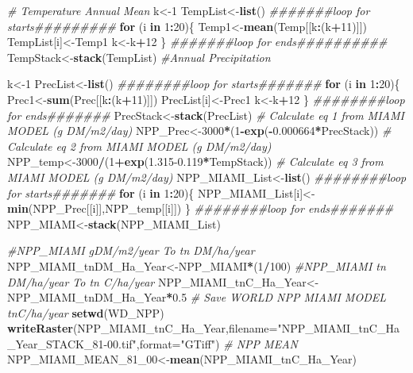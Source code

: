 \documentclass[
  10pt,
  b5paper,
]{book}
\newenvironment{Shaded}{\begin{snugshade}}{\end{snugshade}}
\newcommand{\CommentTok}[1]{\textcolor[rgb]{0.56,0.35,0.01}{\textit{#1}}}
\newcommand{\ControlFlowTok}[1]{\textcolor[rgb]{0.13,0.29,0.53}{\textbf{#1}}}
\newcommand{\DataTypeTok}[1]{\textcolor[rgb]{0.13,0.29,0.53}{#1}}
\newcommand{\DecValTok}[1]{\textcolor[rgb]{0.00,0.00,0.81}{#1}}
\newcommand{\FloatTok}[1]{\textcolor[rgb]{0.00,0.00,0.81}{#1}}
\newcommand{\KeywordTok}[1]{\textcolor[rgb]{0.13,0.29,0.53}{\textbf{#1}}}
\newcommand{\NormalTok}[1]{#1}
\newcommand{\OperatorTok}[1]{\textcolor[rgb]{0.81,0.36,0.00}{\textbf{#1}}}
\newcommand{\StringTok}[1]{\textcolor[rgb]{0.31,0.60,0.02}{#1}}
\begin{document}
\begin{Shaded}
\begin{Highlighting}[]
\CommentTok{# Temperature Annual Mean }
\NormalTok{k<-}\DecValTok{1}
\NormalTok{TempList<-}\KeywordTok{list}\NormalTok{()}
\CommentTok{#######loop for starts#########}
\ControlFlowTok{for}\NormalTok{ (i }\ControlFlowTok{in} \DecValTok{1}\OperatorTok{:}\DecValTok{20}\NormalTok{)\{}
\NormalTok{Temp1<-}\KeywordTok{mean}\NormalTok{(Temp[[k}\OperatorTok{:}\NormalTok{(k}\OperatorTok{+}\DecValTok{11}\NormalTok{)]])}
\NormalTok{TempList[i]<-Temp1}
\NormalTok{k<-k}\OperatorTok{+}\DecValTok{12}
\NormalTok{\}}
\CommentTok{#######loop for ends##########}
\NormalTok{TempStack<-}\KeywordTok{stack}\NormalTok{(TempList)}
\CommentTok{#Annual Precipitation}

\NormalTok{k<-}\DecValTok{1}
\NormalTok{PrecList<-}\KeywordTok{list}\NormalTok{()}
\CommentTok{########loop for starts#######}
\ControlFlowTok{for}\NormalTok{ (i }\ControlFlowTok{in} \DecValTok{1}\OperatorTok{:}\DecValTok{20}\NormalTok{)\{}
\NormalTok{Prec1<-}\KeywordTok{sum}\NormalTok{(Prec[[k}\OperatorTok{:}\NormalTok{(k}\OperatorTok{+}\DecValTok{11}\NormalTok{)]])}
\NormalTok{PrecList[i]<-Prec1}
\NormalTok{k<-k}\OperatorTok{+}\DecValTok{12}
\NormalTok{\}}
\CommentTok{########loop for ends#######}
\NormalTok{PrecStack<-}\KeywordTok{stack}\NormalTok{(PrecList)}
\CommentTok{# Calculate eq 1 from MIAMI MODEL (g DM/m2/day)}
\NormalTok{NPP_Prec<-}\DecValTok{3000}\OperatorTok{*}\NormalTok{(}\DecValTok{1}\OperatorTok{-}\KeywordTok{exp}\NormalTok{(}\OperatorTok{-}\FloatTok{0.000664}\OperatorTok{*}\NormalTok{PrecStack))}
\CommentTok{# Calculate eq 2 from MIAMI MODEL (g DM/m2/day)}
\NormalTok{NPP_temp<-}\DecValTok{3000}\OperatorTok{/}\NormalTok{(}\DecValTok{1}\OperatorTok{+}\KeywordTok{exp}\NormalTok{(}\FloatTok{1.315-0.119}\OperatorTok{*}\NormalTok{TempStack))}
\CommentTok{# Calculate eq 3 from MIAMI MODEL (g DM/m2/day)}
\NormalTok{NPP_MIAMI_List<-}\KeywordTok{list}\NormalTok{()}
\CommentTok{########loop for starts#######}
\ControlFlowTok{for}\NormalTok{ (i }\ControlFlowTok{in} \DecValTok{1}\OperatorTok{:}\DecValTok{20}\NormalTok{)\{}
\NormalTok{NPP_MIAMI_List[i]<-}\KeywordTok{min}\NormalTok{(NPP_Prec[[i]],NPP_temp[[i]])}
\NormalTok{\}}
\CommentTok{########loop for ends#######}
\NormalTok{NPP_MIAMI<-}\KeywordTok{stack}\NormalTok{(NPP_MIAMI_List)}

\CommentTok{#NPP_MIAMI gDM/m2/year To tn DM/ha/year}
\NormalTok{NPP_MIAMI_tnDM_Ha_Year<-NPP_MIAMI}\OperatorTok{*}\NormalTok{(}\DecValTok{1}\OperatorTok{/}\DecValTok{100}\NormalTok{)}
\CommentTok{#NPP_MIAMI tn DM/ha/year To tn C/ha/year}
\NormalTok{NPP_MIAMI_tnC_Ha_Year<-NPP_MIAMI_tnDM_Ha_Year}\OperatorTok{*}\FloatTok{0.5}
\CommentTok{# Save WORLD NPP MIAMI MODEL tnC/ha/year}
\KeywordTok{setwd}\NormalTok{(WD_NPP)}
\KeywordTok{writeRaster}\NormalTok{(NPP_MIAMI_tnC_Ha_Year,}\DataTypeTok{filename=}\StringTok{"NPP_MIAMI_tnC_Ha_Year_STACK_81-00.tif"}\NormalTok{,}\DataTypeTok{format=}\StringTok{"GTiff"}\NormalTok{)}
\CommentTok{# NPP MEAN}
\NormalTok{NPP_MIAMI_MEAN_}\DecValTok{81}\NormalTok{_}\DecValTok{00}\NormalTok{<-}\KeywordTok{mean}\NormalTok{(NPP_MIAMI_tnC_Ha_Year)}


\end{Highlighting}
\end{Shaded}
\end{document}
